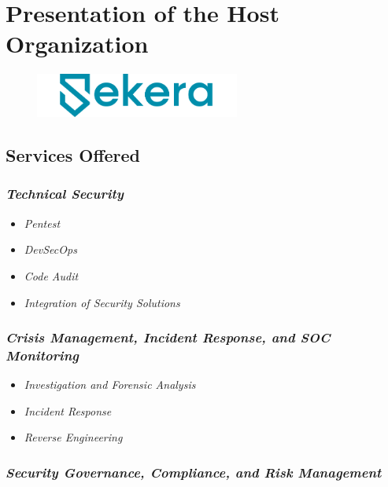 \section{Presentation of the Host Organization}


\vspace*{0.5cm}

\begin{figure}[H]
    \centering
    \includegraphics[width=0.6\textwidth]{img/logos/sekera.png}
    \label{Logo SEKERA Services}
\end{figure}

\subsection{Services Offered}

\subsubsection*{\textit{Technical Security}}

\begin{itemize}[label={$\star$}]
    \item \textit{Pentest}
    \item \textit{DevSecOps}
    \item \textit{Code Audit}
    \item \textit{Integration of Security Solutions}
\end{itemize}

\subsubsection*{\textit{Crisis Management, Incident Response, and SOC Monitoring}}

\begin{itemize}[label={$\star$}]
    \item \textit{Investigation and Forensic Analysis}
    \item \textit{Incident Response}
    \item \textit{Reverse Engineering}
\end{itemize}

\subsubsection*{\textit{Security Governance, Compliance, and Risk Management}}


